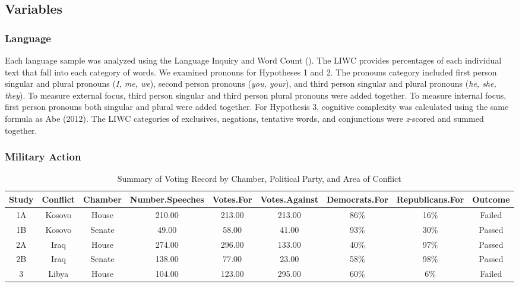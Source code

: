 \documentclass[jou,a4paper]{apa6}
\begin{document}
\subsection{Variables}

\subsubsection{Language}

Each language sample was analyzed using the Language Inquiry and Word Count (\cite{Pennebaker2007}). The LIWC provides percentages of each individual text that fall into each category of words. We examined pronouns for Hypotheses 1 and 2. The pronouns category included first person singular and plural pronouns (\emph{I, me, we}), second person pronouns (\emph{you, your}), and third person singular and plural pronouns (\emph{he, she, they}). To measure external focus, third person singular and third person plural pronouns were added together. To measure internal focus, first person pronouns both singular and plural were added together. For Hypothesis 3, cognitive complexity was calculated using the same formula as Abe (2012). The LIWC categories of exclusives, negations, tentative words, and conjunctions were \emph{z}-scored and summed together.

\subsubsection{Military Action}

\begin{table}[htbp]

\begin{center}
\begin{threeparttable}

\caption{\label{tab:summary-table}Summary of Voting Record by Chamber, Political Party, and Area of Conflict}

\begin{tabular}{ccccccccc}
\toprule
Study & \multicolumn{1}{c}{Conflict} & \multicolumn{1}{c}{Chamber} & \multicolumn{1}{c}{Number.Speeches} & \multicolumn{1}{c}{Votes.For} & \multicolumn{1}{c}{Votes.Against} & \multicolumn{1}{c}{Democrats.For} & \multicolumn{1}{c}{Republicans.For} & \multicolumn{1}{c}{Outcome}\\
\midrule
1A & Kosovo & House & 210.00 & 213.00 & 213.00 & 86\% & 16\% & Failed\\
1B & Kosovo & Senate & 49.00 & 58.00 & 41.00 & 93\% & 30\% & Passed\\
2A & Iraq & House & 274.00 & 296.00 & 133.00 & 40\% & 97\% & Passed\\
2B & Iraq & Senate & 138.00 & 77.00 & 23.00 & 58\% & 98\% & Passed\\
3 & Libya & House & 104.00 & 123.00 & 295.00 & 60\% & 6\% & Failed\\
\bottomrule
\end{tabular}

\end{threeparttable}
\end{center}

\end{table}
\end{document}
